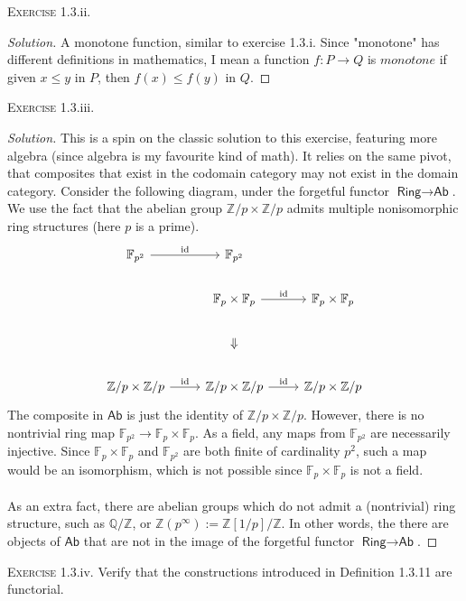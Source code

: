 \documentclass{article}
\newcommand{\Z}{\mathbb{Z}}
\newcommand{\Q}{\mathbb{Q}}
\newcommand{\cat}[1]{\textsf{#1}}
\newenvironment{solution}{\begin{proof}[Solution]}{\end{proof}}
\begin{document}
\noindent \textsc{Exercise} 1.3.ii. \begin{solution}
A monotone function, similar to exercise 1.3.i. Since "monotone" has different definitions in mathematics, I mean a function $f: P \to Q$ is $\textit{monotone}$ if given $x \leq y$ in $P$, then $f(x) \leq f(y)$ in $Q$. 
\end{solution}
\noindent \textsc{Exercise} 1.3.iii.
\begin{solution}
    This is a spin on the classic solution to this exercise, featuring more algebra (since algebra is my favourite kind of math). It relies on the same pivot, that composites that exist in the codomain category may not exist in the domain category. Consider the following diagram, under the forgetful functor $\cat{Ring} \to \cat{Ab}$. We use the fact that the abelian group $\Z/p \times \Z/p$ admits multiple nonisomorphic ring structures (here $p$ is a prime).
    \begin{equation}
    \begin{tikzcd}
        \mathbb{F}_{p^2} \arrow[r, "\text{id}"] &\mathbb{F}_{p^2} \\
        &\mathbb{F}_p \times \mathbb{F}_p \arrow[r, "\text{id}"] &\mathbb{F}_p \times \mathbb{F}_p \\
        &\Downarrow \\
        \Z / p \times \Z / p \arrow[r, "\text{id}"] &\Z / p \times \Z / p \arrow[r, "\text{id}"] &\Z/p \times \Z/p
    \end{tikzcd}
    \end{equation}
    The composite in $\cat{Ab}$ is just the identity of $\Z/p \times \Z/p$. However, there is no nontrivial ring map $\mathbb{F}_{p^2} \to \mathbb{F}_p \times \mathbb{F}_p$. As a field, any maps from $\mathbb{F}_{p^2}$ are necessarily injective. Since $\mathbb{F}_p \times \mathbb{F}_p$ and $\mathbb{F}_{p^2}$ are both finite of cardinality $p^2$, such a map would be an isomorphism, which is not possible since $\mathbb{F}_p \times \mathbb{F}_p$ is not a field. \\ \\
    As an extra fact, there are abelian groups which do not admit a (nontrivial) ring structure, such as $\Q / \Z$, or $\Z(p^{\infty}) := \Z[1/p] / \Z $. In other words, the there are objects of $\cat{Ab}$ that are not in the image of the forgetful functor $\cat{Ring} \to \cat{Ab}$.
\end{solution}
\noindent \textsc{Exercise} 1.3.iv. Verify that the constructions introduced in Definition 1.3.11 are functorial. \\ \\
\end{document}
